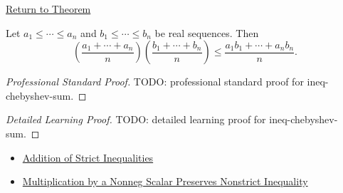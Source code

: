 \newpage
{}
\label{prf:ineq-chebyshev-sum}

\begin{remark*}[Return]
\hyperref[thm:ineq-chebyshev-sum]{Return to Theorem}
\end{remark*}

\begin{theorem*}
Let $a_1\le\cdots\le a_n$ and $b_1\le\cdots\le b_n$ be real sequences.
Then
\[
\left(\frac{a_1+\cdots+a_n}{n}\right)
\left(\frac{b_1+\cdots+b_n}{n}\right)
\le
\frac{a_1b_1+\cdots+a_nb_n}{n}.
\]
\end{theorem*}

\begin{proof}[Professional Standard Proof]
\LRAProofBodyStart
TODO: professional standard proof for ineq-chebyshev-sum.
\end{proof}

\begin{proof}[Detailed Learning Proof]
\LRAProofBodyStart
TODO: detailed learning proof for ineq-chebyshev-sum.
\end{proof}

\begin{remark*}
\end{remark*}

\begin{dependencies}
\begin{itemize}
  \item \hyperref[thm:ineq-add-inequalities]{Addition of Strict Inequalities}
  \item \hyperref[thm:ineq-nonstrict-multiply-nonneg]{Multiplication by a Nonneg Scalar Preserves Nonstrict Inequality}
\end{itemize}
\end{dependencies}

\clearpage

